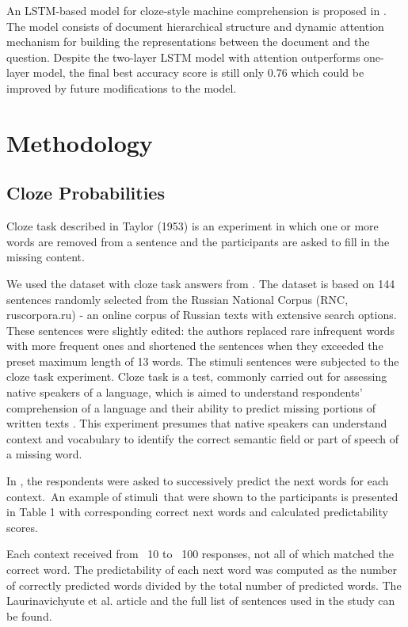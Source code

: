 \documentclass[a4paper]{article}
\begin{document}
An LSTM-based model for cloze-style machine comprehension is proposed in \cite{wang-cloze}. The model consists of document hierarchical structure and dynamic attention mechanism for building the representations between the document and the question. Despite the two-layer LSTM model with attention outperforms one-layer model, the final best accuracy score is still only 0.76 which could be improved by future modifications to the model.


\section{Methodology}

\subsection{Cloze Probabilities}

Cloze task described in Taylor (1953) is an experiment in which one or more words are removed from a sentence and the participants are asked to fill in the missing content. 

We used the dataset with cloze task answers from \cite{laurinavichyute}. The dataset is based on 144 sentences randomly selected from the Russian National Corpus (RNC, ruscorpora.ru) - an online corpus of Russian texts with extensive search options. These sentences were slightly edited: the authors replaced rare infrequent words with more frequent ones and shortened the sentences when they exceeded the preset maximum length of 13 words. The stimuli sentences were subjected to the cloze task experiment. Cloze task \cite{taylor:1953} is a test, commonly carried out for assessing native speakers of a language, which is aimed to understand respondents’ comprehension of a language and their ability to predict missing portions of written texts \cite{laurinavichyute}. This experiment presumes that native speakers can understand context and vocabulary to identify the correct semantic field or part of speech of a missing word.

In \cite{laurinavichyute}, the respondents were asked to successively predict the next words for each context. An example of stimuli that were shown to the participants is presented in Table 1 with corresponding correct next words and calculated predictability scores.

Each context received from ~10 to ~100 responses, not all of which matched the correct word. The predictability of each next word was computed as the number of correctly predicted words divided by the total number of predicted words. The Laurinavichyute et al. article and the full list of sentences used in the study can be found. 
\end{document}
